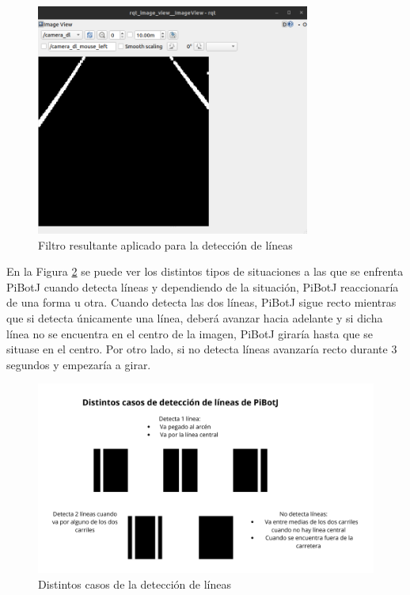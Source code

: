  \begin{figure} [h!]
	\begin{center}
		\includegraphics[width=9cm]{figs/cap6/camaradlines.png}
	\end{center}
	\caption{Filtro resultante aplicado para la detección de líneas}
	\label{fig:camaradlines}
\end{figure}


En la Figura \ref{fig:dlines} se puede ver los distintos tipos de situaciones a las que se enfrenta PiBotJ cuando detecta líneas y dependiendo de la situación, PiBotJ reaccionaría de una forma u otra. Cuando detecta las dos líneas, PiBotJ sigue recto mientras que si detecta únicamente una línea, deberá avanzar hacia adelante y si dicha línea no se encuentra en el centro de la imagen, PiBotJ giraría hasta que se situase en el centro. Por otro lado, si no detecta líneas avanzaría recto durante 3 segundos y empezaría a girar.

 \begin{figure} [h!]
	\begin{center}
		\includegraphics[width=15cm]{figs/cap6/casosdlines.png}
	\end{center}
	\caption{Distintos casos de la detección de líneas}
	\label{fig:dlines}
\end{figure}

